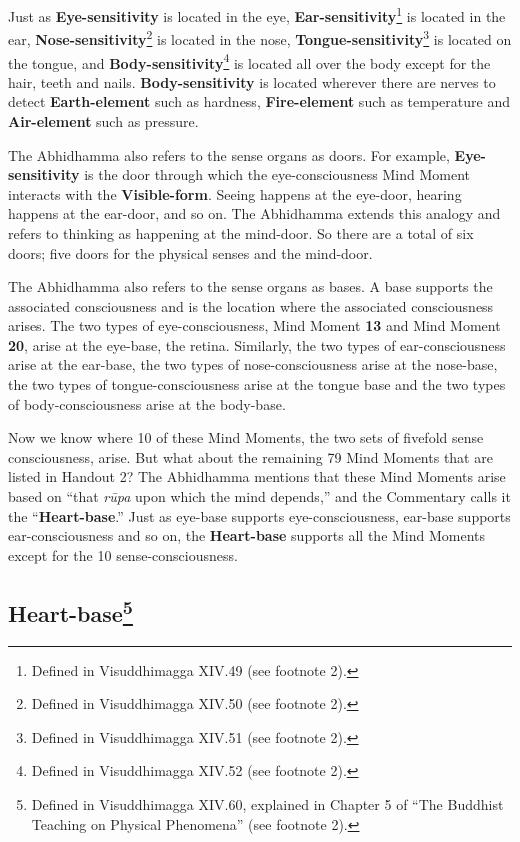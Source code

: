 Just as \textbf{Eye-sensitivity} is located in the eye, \textbf{Ear-sensitivity}\footnote{Defined in Visuddhimagga XIV.49 (see footnote 2).} is located in the ear, \textbf{Nose-sensitivity}\footnote{Defined in Visuddhimagga XIV.50 (see footnote 2).} is located in the nose, \textbf{Tongue-sensitivity}\footnote{Defined in Visuddhimagga XIV.51 (see footnote 2).} is located on the tongue, and \textbf{Body-sensitivity}\footnote{Defined in Visuddhimagga XIV.52 (see footnote 2).} is located all over the body except for the hair, teeth and nails. \textbf{Body-sensitivity} is located wherever there are nerves to detect \textbf{Earth-element} such as hardness, \textbf{Fire-element} such as temperature and \textbf{Air-element} such as pressure.

The Abhidhamma also refers to the sense organs as doors. For example, \textbf{Eye-sensitivity} is the door through which the eye-consciousness Mind Moment interacts with the \textbf{Visible-form}. Seeing happens at the eye-door, hearing happens at the ear-door, and so on. The Abhidhamma extends this analogy and refers to thinking as happening at the mind-door. So there are a total of six doors; five doors for the physical senses and the mind-door.

The Abhidhamma also refers to the sense organs as bases. A base supports the associated consciousness and is the location where the associated consciousness arises. The two types of eye-consciousness, Mind Moment \textbf{13} and Mind Moment \textbf{20}, arise at the eye-base, the retina. Similarly, the two types of ear-consciousness arise at the ear-base, the two types of nose-consciousness arise at the nose-base, the two types of tongue-consciousness arise at the tongue base and the two types of body-consciousness arise at the body-base.

Now we know where 10 of these Mind Moments, the two sets of fivefold sense consciousness, arise. But what about the remaining 79 Mind Moments that are listed in Handout 2? The Abhidhamma mentions that these Mind Moments arise based on “that \textit{rūpa} upon which the mind depends,” and the Commentary calls it the “\textbf{Heart-base}.” Just as eye-base supports eye-consciousness, ear-base supports ear-consciousness and so on, the \textbf{Heart-base} supports all the Mind Moments except for the 10 sense-consciousness.

\subsection*{Heart-base\footnote{Defined in Visuddhimagga XIV.60, explained in Chapter 5 of “The Buddhist Teaching on Physical Phenomena” (see footnote 2).}}

